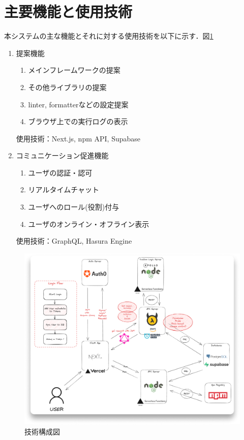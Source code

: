 \documentclass[main]{subfiles}
\begin{document}
\section{主要機能と使用技術}
本システムの主な機能とそれに対する使用技術を以下に示す．図\ref{fig:techstack}

\begin{enumerate}
\item 提案機能
\begin{enumerate}
\item メインフレームワークの提案
\item その他ライブラリの提案
\item linter, formatterなどの設定提案
\item ブラウザ上での実行ログの表示
\end{enumerate}
使用技術：Next.js, npm API, Supabase

\item コミュニケーション促進機能
\begin{enumerate}
\item ユーザの認証・認可
\item リアルタイムチャット
\item ユーザへのロール(役割)付与
\item ユーザのオンライン・オフライン表示
\end{enumerate}
使用技術：GraphQL, Hasura Engine
\end{enumerate}

\begin{figure}[h]
    \centering
    \includegraphics[keepaspectratio,width=0.9\linewidth]{../figures/techstack.png}
    \caption{技術構成図}
    \label{fig:techstack}
\end{figure}
\end{document}

